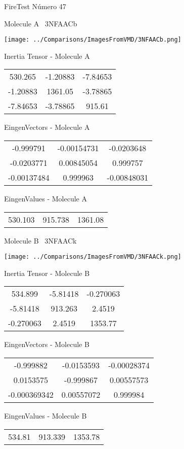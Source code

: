 \vtab[-3cm]
\begin{center}
{\large FireTest \tab Número 47}
\end{center}
\begin{multicols}{2}
\begin{center}

Molecule A \
3NFAACb

\texttt{[image: ../Comparisons/ImagesFromVMD/3NFAACb.png]}

Inertia Tensor - Molecule A \\
\begin{tabular}{|c c c|}
530.265	 & 	-1.20883	 & 	-7.84653	 \\
-1.20883	 & 	1361.05	 & 	-3.78865	 \\
-7.84653	 & 	-3.78865	 & 	915.61
\end{tabular}

\vtab
 EingenVectors - Molecule A     \\
\begin{tabular}{|c c c|}
-0.999791	 & 	-0.00154731	 & 	-0.0203648	 \\
-0.0203771	 & 	0.00845054	 & 	0.999757	 \\
-0.00137484	 & 	0.999963	 & 	-0.00848031
\end{tabular}

\vtab
 EingenValues - Molecule A     \\
\begin{tabular}{|c c c|}
530.103	 & 	915.738	 & 	1361.08	 \\
\end{tabular}
\columnbreak

Molecule B \
3NFAACk

\texttt{[image: ../Comparisons/ImagesFromVMD/3NFAACk.png]}

Inertia Tensor - Molecule B \\
\begin{tabular}{|c c c|}
534.899	 & 	-5.81418	 & 	-0.270063	 \\
-5.81418	 & 	913.263	 & 	2.4519	 \\
-0.270063	 & 	2.4519	 & 	1353.77
\end{tabular}

\vtab
 EingenVectors - Molecule B     \\
\begin{tabular}{|c c c|}
-0.999882	 & 	-0.0153593	 & 	-0.00028374	 \\
0.0153575	 & 	-0.999867	 & 	0.00557573	 \\
-0.000369342	 & 	0.00557072	 & 	0.999984
\end{tabular}

\vtab
 EingenValues - Molecule B     \\
\begin{tabular}{|c c c|}
534.81	 & 	913.339	 & 	1353.78	 \\
\end{tabular}

\end{center}
\end{multicols}

